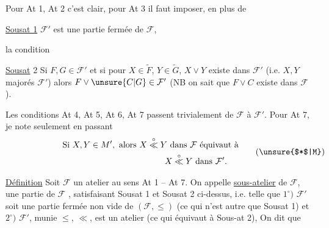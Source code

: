 Pour At 1, At 2 c'est clair, pour At 3 il faut  imposer, en plus de

\uline{Sousat 1} $\mathcal F'$ est une partie fermée  de $\mathcal F$,

la condition

\uline{Sousat} 2 Si $F,G\in\mathcal F'$ et si pour  $X\in\widetilde F$, $Y\in\widetilde G$, $X\vee Y$ existe dans $\mathcal F'$ (i.e.  $X,Y$ majorés  $\mathcal F'$) alors $F\vee\unsure{C|G}\in\mathcal F'$ (NB on sait que $F\vee C$ existe dans $\mathcal F$).

Les conditions At 4, At 5, At 6, At 7  passent trivialement  de $\mathcal F$ à $\mathcal F'$. Pour At 7, je note seulement en passant
\[
\begin{aligned}
&\text{Si }X,Y\in M',\ \text{alors }X\mathrel{\overset{\circ}{\ll}}Y\text{ dans }\mathcal F\text{ équivaut à}\\
&\hspace{12em}X\mathrel{\overset{\circ}{\ll}}Y\text{ dans }\mathcal F'.
\end{aligned}\tag*{\makebox[0pt][r]{\makebox[\displaywidth][l]{(\unsure{$*$|M})}}}
\]


\uline{Définition} Soit $\mathcal F$ un atelier au sens At 1 -- At 7. On appelle \uline{sous-atelier} de $\mathcal F$, une partie  de $\mathcal F$ , satisfaisant  Sousat 1 et Sousat 2 ci-dessus, i.e. telle que $1^\circ)$ $\mathcal F'$ soit une partie fermée non vide de $(\mathcal F,\leq)$  (ce qui n'est autre que Sousat 1) et $2^\circ)$ $\mathcal F'$, munie  $\leq$, $\ll$, est un atelier (ce qui équivaut à Sous-at 2), On dit que


